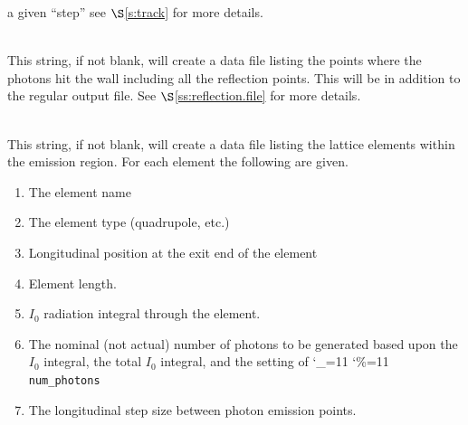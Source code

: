 \documentclass[11pt,openany]{report}
\newcommand{\sref}[1]{$\S$\ref{#1}}
\newcommand\ttcmd{\begingroup\catcode`\_=11 \catcode`\%=11 \dottcmd}
\newcommand\dottcmd[1]{\texttt{#1}\endgroup}
\newcommand{\vn}{\ttcmd}
\newcommand{\Newline}{\hfil \\}
\begin{document}
\begin{description}
a given ``step'' see \sref{s:track} for more details.
  \item[\vn{wall_hit_file}] \Newline
This string, if not blank, will create a data file listing the points
where the photons hit the wall including all the reflection
points. This will be in addition to the regular output file.  See
\sref{ss:reflection.file} for more details.
  \item[\vn{lat_ele_file}] \Newline
This string, if not blank, will create a data file listing  the lattice
elements within the emission region. For each element the following are given. 
  \begin{enumerate}
  \item
    The element name
  \item
    The element type (quadrupole, etc.)
  \item
    Longitudinal position at the exit end of the element
  \item
    Element length.
  \item
    $I_0$ radiation integral through the element.
  \item
    The nominal (not actual) number of photons to be generated based upon the $I_0$ integral,
    the total $I_0$ integral, and the setting of \vn{num_photons}
  \item
    The longitudinal step size between photon emission points.
  \end{enumerate}


\end{description}
\end{document}
